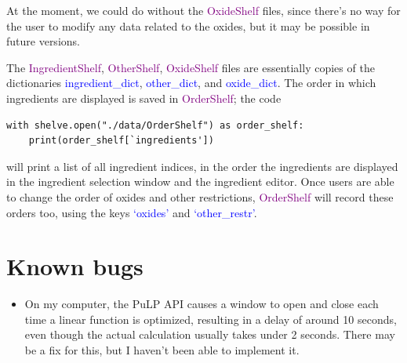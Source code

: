 \documentclass[a4paper,10pt]{article}
\def\blue{\textcolor{blue}}
\def\green{\textcolor{Purple}}
\begin{document}
At the moment, we could do without the \green{OxideShelf} files, since there's no way for the user to modify any data related to the oxides, but it may be possible in future versions.

The \green{IngredientShelf}, \green{OtherShelf}, \green{OxideShelf} files are essentially copies of the dictionaries \blue{ingredient\_dict}, \blue{other\_dict}, and \blue{oxide\_dict}. The order in which ingredients are displayed is saved in \green{OrderShelf}; the code
\begin{flushleft}
\begin{lstlisting}
with shelve.open("./data/OrderShelf") as order_shelf:
    print(order_shelf[`ingredients'])
\end{lstlisting}
\end{flushleft}
will print a list of all ingredient indices, in the order the ingredients are displayed in the ingredient selection window and the ingredient editor. Once users are able to change the order of oxides and other restrictions, \green{OrderShelf} will record these orders too, using the keys \blue{`oxides'} and \blue{`other\_restr'}.

\section{Known bugs}
\begin{itemize}
\item On my computer, the PuLP API causes a window to open and close each time a linear function is optimized, resulting in a delay of around 10 seconds, even though the actual calculation usually takes under 2 seconds. There may be a fix for this, but I haven't been able to implement it.
\end{itemize}
\end{document}
